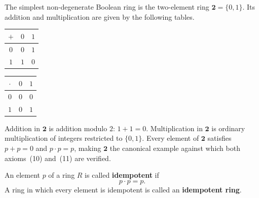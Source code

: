 

The simplest non-degenerate Boolean ring is the two-element ring
$\mathbf{2} = \{0, 1\}$.
Its addition and multiplication are given by the following tables.

\begin{center}
\begin{tabular}{c|cc}
$+$ & $0$ & $1$ \\ \hline
$0$ & $0$ & $1$ \\
$1$ & $1$ & $0$
\end{tabular}
\qquad\qquad
\begin{tabular}{c|cc}
$\cdot$ & $0$ & $1$ \\ \hline
$0$ & $0$ & $0$ \\
$1$ & $0$ & $1$
\end{tabular}
\end{center}

\noindent
Addition in $\mathbf{2}$ is addition modulo $2$: $1 + 1 = 0$.
Multiplication in $\mathbf{2}$ is ordinary multiplication of
integers restricted to $\{0, 1\}$.
Every element of $\mathbf{2}$ satisfies $p + p = 0$ and
$p \cdot p = p$, making $\mathbf{2}$ the canonical example against
which both axioms~(10) and~(11) are verified.


\begin{tcolorbox}[colback=propbox, colframe=propborder, arc=2pt,
  left=6pt, right=6pt, top=4pt, bottom=4pt,
  title={\small\textbf{Definition --- Idempotent Element}},
  fonttitle=\small\bfseries]
\begin{definition}
\label{def:idempotent-element}
An element $p$ of a ring $R$ is called \textbf{idempotent} if
\[
p \cdot p = p.
\]
A ring in which every element is idempotent is called an
\textbf{idempotent ring}.
\end{definition}
\end{tcolorbox}

